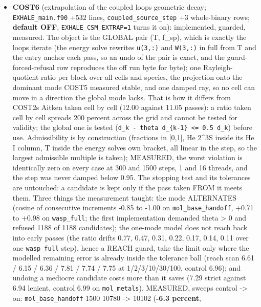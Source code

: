 \documentclass[english,a4paper]{my_memo}
\begin{document}
\begin{itemize}
\item
  \textbf{COST6} (extrapolation of the coupled loop\textquotesingle s geometric decay;
  \texttt{EXHALE\_main.f90} +532 lines, \texttt{coupled\_source\_step} +3 whole-binary rows;
  \textbf{default OFF}, \texttt{EXHALE\_CSM\_EXTRAP=1} turns it on): implemented, guarded,
  measured. The object is the GLOBAL pair (T, f\_sp), which is exactly the
  loop\textquotesingle s iterate (the energy solve rewrites \texttt{u(3,:)} and \texttt{W(3,:)} in full
  from T and the entry anchor each pass, so an undo of the pair is exact,
  and the guard-forced-refusal row reproduces the off run byte for byte);
  one Rayleigh-quotient ratio per block over all cells and species, the
  projection onto the dominant mode COST5 measured stable, and one damped
  ray, so no cell can move in a direction the global mode lacks. That is how
  it differs from COST2\textquotesingle s Aitken taken cell by cell (12.00 against 11.05 passes): a
  ratio taken cell by cell spreads 200 percent across the grid and cannot be
  tested for validity; the global one is tested (\texttt{\textbar{}\textbar{}d\_k\ -\ theta\ d\_\{k-1\}\textbar{}\textbar{}\ \textless{}=\ 0.5\ \textbar{}\textbar{}d\_k\textbar{}\textbar{}}) before use. Admissibility is by construction (fractions in
  {[}0,1{]}, He 2\^{}3S inside its He I column, T inside the energy solve\textquotesingle s own
  bracket, all linear in the step, so the largest admissible multiple is
  taken); MEASURED, the worst violation is identically zero on every case at
  300 and 1500 steps, 1 and 16 threads, and the step was never damped below
  0.95. The stopping test and its tolerances are untouched: a candidate is
  kept only if the pass taken FROM it meets them. Three things the
  measurement taught: the mode ALTERNATES (cosine of consecutive increments
  -0.85 to -1.00 on \texttt{mol\_base\_handoff}, +0.71 to +0.98 on \texttt{wasp\_full}; the
  first implementation demanded theta \textgreater{} 0 and refused 1188 of 1188
  candidates); the one-mode model does not reach back into early passes
  (the ratio drifts 0.77, 0.47, 0.31, 0.22, 0.17, 0.14, 0.11 over one
  \texttt{wasp\_full} step), hence a REACH guard, take the limit only where the
  modelled remaining error is already inside the tolerance ball (reach scan
  6.61 / 6.15 / 6.36 / 7.81 / 7.74 / 7.75 at 1/2/3/10/30/100, control 6.96);
  and undoing a mediocre candidate costs more than it saves (7.29 strict
  against 6.94 lenient, control 6.99 on \texttt{mol\_metals}). MEASURED, sweeps
  control -\textgreater{} on: \texttt{mol\_base\_handoff} 1500 10780 -\textgreater{} 10102 (\textbf{-6.3 percent},

\end{itemize}
\end{document}
